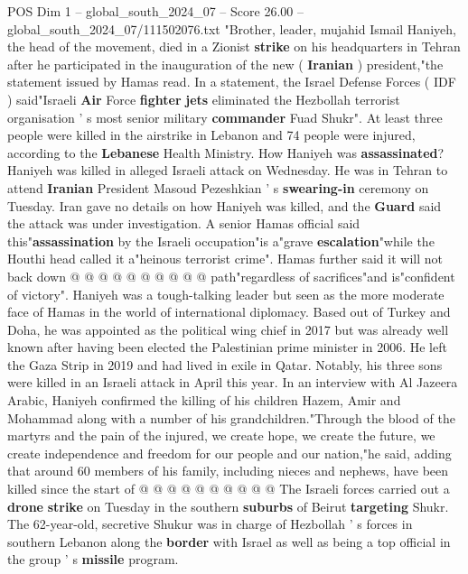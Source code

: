 \begin{textsample}{POS Dim 1 – global\_south\_2024\_07 – Score 26.00 – global\_south\_2024\_07/111502076.txt}  \label{ex:f1_pos_065}
"Brother, leader, mujahid Ismail Haniyeh, the head of the movement, died in a Zionist \textbf{strike} on his headquarters in Tehran after he participated in the inauguration of the new ( \textbf{Iranian} ) president,"the statement issued by Hamas read.
In a statement, the Israel Defense Forces ( IDF ) said"Israeli \textbf{Air} Force \textbf{fighter} \textbf{jets} eliminated the Hezbollah terrorist organisation ' s most senior military \textbf{commander} Fuad Shukr".
At least three people were killed in the airstrike in Lebanon and 74 people were injured, according to the \textbf{Lebanese} Health Ministry.
How Haniyeh was \textbf{assassinated}?
Haniyeh was killed in alleged Israeli attack on Wednesday.
He was in Tehran to attend \textbf{Iranian} President Masoud Pezeshkian ' s \textbf{swearing-in} ceremony on Tuesday.
Iran gave no details on how Haniyeh was killed, and the \textbf{Guard} said the attack was under investigation.
A senior Hamas official said this"\textbf{assassination} by the Israeli occupation"is a"grave \textbf{escalation}"while the Houthi head called it a"heinous terrorist crime".
Hamas further said it will not back down @ @ @ @ @ @ @ @ @ @ path"regardless of sacrifices"and is"confident of victory".
Haniyeh was a tough-talking leader but seen as the more moderate face of Hamas in the world of international diplomacy.
Based out of Turkey and Doha, he was appointed as the political wing chief in 2017 but was already well known after having been elected the Palestinian prime minister in 2006.
He left the Gaza Strip in 2019 and had lived in exile in Qatar.
Notably, his three sons were killed in an Israeli attack in April this year.
In an interview with Al Jazeera Arabic, Haniyeh confirmed the killing of his children Hazem, Amir and Mohammad along with a number of his grandchildren."Through the blood of the martyrs and the pain of the injured, we create hope, we create the future, we create independence and freedom for our people and our nation,"he said, adding that around 60 members of his family, including nieces and nephews, have been killed since the start of @ @ @ @ @ @ @ @ @ @ The Israeli forces carried out a \textbf{drone} \textbf{strike} on Tuesday in the southern \textbf{suburbs} of Beirut \textbf{targeting} Shukr.
The 62-year-old, secretive Shukur was in charge of Hezbollah ' s forces in southern Lebanon along the \textbf{border} with Israel as well as being a top official in the group ' s \textbf{missile} program.

\end{textsample}
